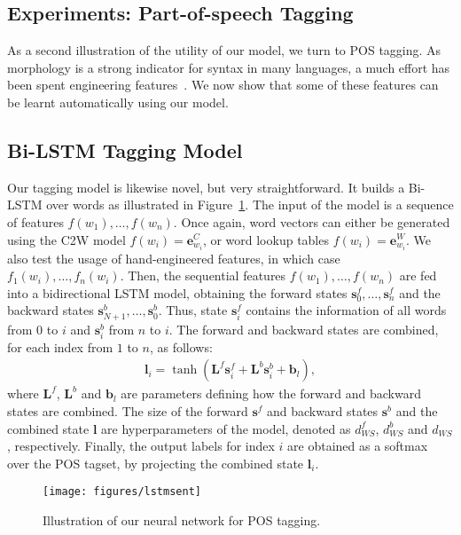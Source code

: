 \documentclass[11pt]{article}
\begin{document}
\begin{CJK*}{UTF8}{gbsn}
\section{Experiments: Part-of-speech Tagging}
\label{sec:pos}

As a second illustration of the utility of our model, we turn to POS tagging. As morphology is a strong indicator for syntax in many languages, a much effort has been spent engineering features~\cite{Nakagawa01unknownword,D13-1032}. We now show that some of these features can be learnt automatically using our model. 

\subsection{Bi-LSTM Tagging Model}

Our tagging model is likewise novel, but very straightforward. It builds a Bi-LSTM over words as illustrated in Figure~\ref{bow}. The input of the model is a sequence of features $f(w_1),\ldots,f(w_n)$. Once again, word vectors can either be generated using the C2W model $f(w_i)=\mathbf{e}^C_{w_i}$, or word lookup tables $f(w_i)=\mathbf{e}^W_{w_i}$. We also test the usage of hand-engineered features, in which case  $f_1(w_i),\ldots,f_n(w_i)$. Then, the sequential features $f(w_1),\ldots,f(w_n)$ are fed into a bidirectional LSTM model, obtaining the forward states $\mathbf{s}^f_0,\ldots,\mathbf{s}^f_n$ and the backward states $\mathbf{s}^b_{N+1},\ldots,\mathbf{s}^b_{0}$. Thus, state $\mathbf{s}^f_i$ contains the information of all words from $0$ to $i$ and $\mathbf{s}^b_i$ from $n$ to $i$. The forward and backward states are combined, for each index from $1$ to $n$, as follows:
\begin{align*}
\mathbf{l}_i = \tanh(\mathbf{L}^f \mathbf{s}^f_i + \mathbf{L}^b \mathbf{s}^b_i + \mathbf{b}_{l}),
\end{align*}
where $\mathbf{L}^f$, $\mathbf{L}^b$ and $\mathbf{b}_{l}$ are parameters defining how the forward and backward states are combined. The size of the forward $\mathbf{s}^f$ and backward states $\mathbf{s}^b$ and the combined state $\mathbf{l}$ are hyperparameters of the model, denoted as $d^f_{WS}$, $d^b_{WS}$ and $d_{WS}$, respectively. Finally, the output labels for index $i$ are obtained as a softmax over the POS tagset, by projecting the combined state $\mathbf{l}_i$.

\label{sec:posmodel}
\begin{figure}[ht]
\begin{center}
\centerline{\texttt{[image: figures/lstmsent]}}
\caption{Illustration of our neural network for POS tagging.}
\label{bow}
\end{center}
\end{figure} 


\end{CJK*}
\end{document}

